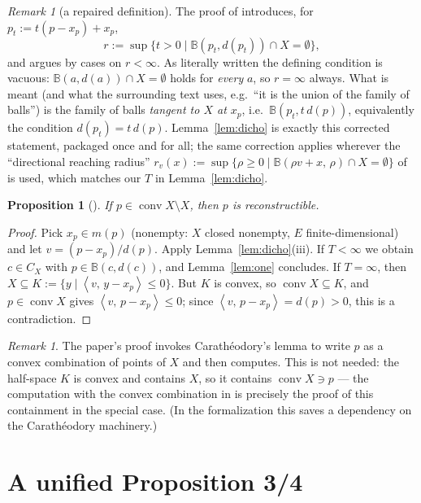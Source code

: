 \documentclass[11pt]{article}
\newtheorem{proposition}[theorem]{Proposition}
\theoremstyle{remark}
\newtheorem{remark}[theorem]{Remark}
\newcommand{\B}{\mathbb{B}}
\newcommand{\X}{X}
\newcommand{\conv}{\operatorname{conv}}
\newcommand{\sca}[2]{\left\langle #1,\, #2\right\rangle}
\newcommand{\Cx}{C_{\X}}
\begin{document}
\begin{remark}[a repaired definition]\label{rem:prop2sup}
The proof of \cite[Proposition~2]{Bia} introduces, for $p_t:=t(p-x_p)+x_p$,
\[
 r:=\sup\{t>0\mid \B(p_t,d(p_t))\cap \X=\emptyset\},
\]
and argues by cases on $r<\infty$. As literally written the defining condition is vacuous:
$\B(a,d(a))\cap \X=\emptyset$ holds for \emph{every} $a$, so $r=\infty$ always. What is meant
(and what the surrounding text uses, e.g.\ ``it is the union of the family of balls'') is the
family of balls \emph{tangent to $\X$ at $x_p$}, i.e.\ $\B(p_t,t\,d(p))$, equivalently the
condition $d(p_t)=t\,d(p)$. Lemma~\ref{lem:dicho} is exactly this corrected statement, packaged
once and for all; the same correction applies wherever the ``directional reaching radius''
$r_v(x):=\sup\{\rho\ge0\mid\B(\rho v+x,\,\rho)\cap \X=\emptyset\}$ of \cite{Bia} is used, which
matches our $T$ in Lemma~\ref{lem:dicho}.
\end{remark}

\begin{proposition}[{\cite[Proposition~2]{Bia}}]\label{prop:two}
If $p\in\conv \X\setminus \X$, then $p$ is reconstructible.
\end{proposition}

\begin{proof}
Pick $x_p\in m(p)$ (nonempty: $\X$ closed nonempty, $E$ finite-dimensional) and let
$v=(p-x_p)/d(p)$. Apply Lemma~\ref{lem:dicho}(iii). If $T<\infty$ we obtain $c\in\Cx$ with
$p\in\B(c,d(c))$, and Lemma~\ref{lem:one} concludes. If $T=\infty$, then
$\X\subseteq K:=\{y\mid \sca{v}{y-x_p}\le0\}$. But $K$ is convex, so $\conv \X\subseteq K$, and
$p\in\conv \X$ gives $\sca{v}{p-x_p}\le0$; since $\sca{v}{p-x_p}=d(p)>0$, this is a
contradiction.
\end{proof}

\begin{remark}\label{rem:prop2cara}
The paper's proof invokes Carath\'eodory's lemma to write $p$ as a convex combination of points
of $\X$ and then computes. This is not needed: the half-space $K$ is convex and contains $\X$, so
it contains $\conv \X\ni p$ --- the computation with the convex combination in \cite{Bia} is
precisely the proof of this containment in the special case. (In the formalization this saves a
dependency on the Carath\'eodory machinery.)
\end{remark}

\section{A unified Proposition 3/4}\label{sec:unified}
\end{document}
